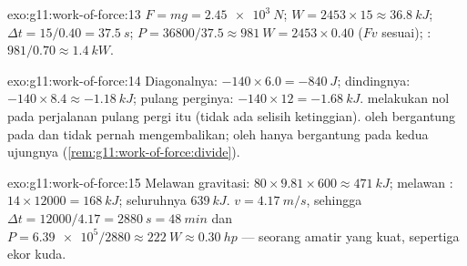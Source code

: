 \begin{solution}{exo:g11:work-of-force:13}
$F = mg = \qty{2.45e3}{N}$;
$W = 2453 \times 15 \approx \qty{36.8}{kJ}$;
$\Delta t = 15/0.40 = \qty{37.5}{s}$;
$P = 36800/37.5 \approx \qty{981}{W} = 2453 \times 0.40$ ($Fv$ sesuai);
: $981/0.70 \approx \qty{1.4}{kW}$.
\end{solution}

\begin{solution}{exo:g11:work-of-force:14}
Diagonalnya: $-140 \times 6.0 = -\qty{840}{J}$; dindingnya:
$-140 \times 8.4 \approx -\qty{1.18}{kJ}$; pulang perginya:
$-140 \times 12 = -\qty{1.68}{kJ}$.  melakukan nol pada
perjalanan pulang pergi itu (tidak ada selisih ketinggian).  oleh
 bergantung pada  dan tidak pernah mengembalikan;
 oleh  hanya bergantung pada kedua ujungnya
(\cref{rem:g11:work-of-force:divide}).
\end{solution}

\begin{solution}{exo:g11:work-of-force:15}
Melawan gravitasi: $80 \times 9.81 \times 600 \approx \qty{471}{kJ}$;
melawan : $14 \times 12000 = \qty{168}{kJ}$; seluruhnya
$\qty{639}{kJ}$. $v = \qty{4.17}{m/s}$, sehingga
$\Delta t = 12000/4.17 = \qty{2880}{s} =
\qty{48}{min}$ dan
$P = \num{6.39e5}/2880 \approx \qty{222}{W} \approx
\qty{0.30}{hp}$ ---
seorang amatir yang kuat, sepertiga ekor kuda.
\end{solution}

